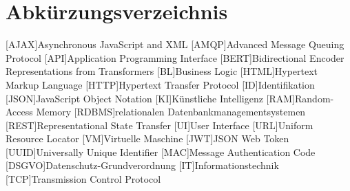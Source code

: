 \section{Abkürzungsverzeichnis}
\begin{acronym}
	[AJAX]{Asynchronous JavaScript and XML}
	[AMQP]{Advanced Message Queuing Protocol}
	[API]{Application Programming Interface}
	[BERT]{Bidirectional Encoder Representations from Transformers}
	[BL]{Business Logic}
	[HTML]{Hypertext Markup Language}
	[HTTP]{Hypertext Transfer Protocol}
	[ID]{Identifikation}
	[JSON]{JavaScript Object Notation}
	[KI]{Künstliche Intelligenz}
	[RAM]{Random-Access Memory}
	[RDBMS]{relationalen Datenbankmanagementsystemen}
	[REST]{Representational State Transfer}
	[UI]{User Interface}
	[URL]{Uniform Resource Locator}
	[VM]{Virtuelle Maschine}
	[JWT]{JSON Web Token}
	[UUID]{Universally Unique Identifier}
	[MAC]{Message Authentication Code}
	[DSGVO]{Datenschutz-Grundverordnung}
	[IT]{Informationstechnik}
	[TCP]{Transmission Control Protocol}
\end{acronym}
